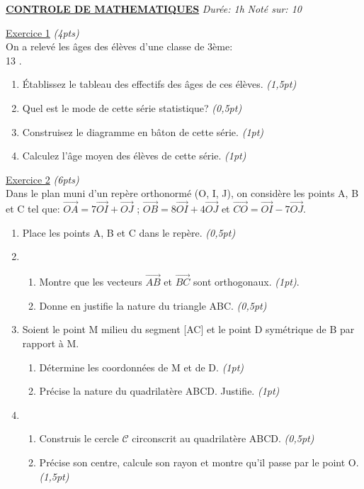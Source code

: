 \documentclass[12pt,a4paper]{book}
\newcommand{\matiere}{MATHEMATIQUES}
\begin{document}
\newpage
\textbf{\underline{CONTROLE DE \matiere}}  \qquad \qquad  \qquad \qquad \emph{Durée: 1h} \qquad \qquad \emph{Noté sur: 10} \\
\par
\underline{Exercice 1} \emph{(4pts)}\\
On a relevé les âges des élèves d'une classe de 3ème:\\
13                                       .
\begin{enumerate}
\item Établissez le tableau des effectifs des âges de ces élèves. \emph{(1,5pt)}
\item Quel est le mode de cette série statistique? \emph{(0,5pt)}
\item Construisez le diagramme en bâton de cette série. \emph{(1pt)}
\item Calculez l'âge moyen des élèves de cette série. \emph{(1pt)}
\end{enumerate}
\vspace{0,5cm}
\underline{Exercice 2} \emph{(6pts)} \\
Dans le plan muni d'un repère orthonormé (O, I, J), on considère les points A, B et C tel que: $\overrightarrow{OA}=7\overrightarrow{OI}+\overrightarrow{OJ}$ ; $\overrightarrow{OB}=8\overrightarrow{OI}+4\overrightarrow{OJ}$ et $\overrightarrow{CO}=\overrightarrow{OI}-7\overrightarrow{OJ}$.
\begin{enumerate}
\item Place les points A, B et C dans le repère. \emph{(0,5pt)}
\item \begin{enumerate}
\item Montre que les vecteurs $\overrightarrow{AB}$ et $\overrightarrow{BC}$ sont orthogonaux. \emph{(1pt)}.
\item Donne en justifie la nature du triangle ABC. \emph{(0,5pt)}
\end{enumerate}
\item Soient le point M milieu du segment [AC] et le point D symétrique de B par rapport à M.
\begin{enumerate}
\item Détermine les coordonnées de M et de D. \emph{(1pt)}
\item Précise la nature du quadrilatère ABCD. Justifie. \emph{(1pt)}
\end{enumerate} 
\item \begin{enumerate}
\item Construis le cercle $\mathcal{C}$ circonscrit au quadrilatère ABCD. \emph{(0,5pt)}
\item Précise son centre, calcule son rayon et montre qu'il passe par le point O. \emph{(1,5pt)}
\end{enumerate}
\end{enumerate}
\end{document}
